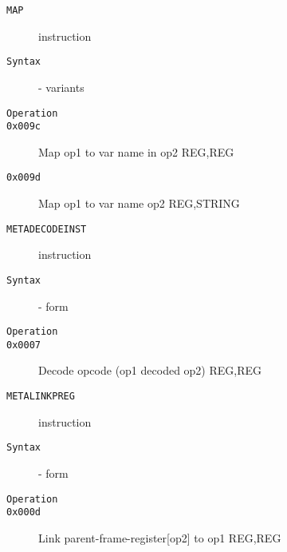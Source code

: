 \begin{description}
\item[\texttt{MAP}] instruction\\
\item[\texttt{Syntax}] - variants\\

\item[\texttt{Operation}]
\item[\texttt{}]
\item[\texttt{0x009c}] Map op1 to var name in op2  {REG,REG}           \\
\item[\texttt{0x009d}] Map op1 to var name op2  {REG,STRING}        \\
\end{description}
\clearpage
\begin{description}
\item[\texttt{METADECODEINST}] instruction\\
\item[\texttt{Syntax}] - form \\

\item[\texttt{Operation}]
\item[\texttt{}]
\item[\texttt{0x0007}]     Decode opcode (op1 decoded op2)  {REG,REG}       \\
\end{description}
\clearpage
\begin{description}
\item[\texttt{METALINKPREG}] instruction\\
\item[\texttt{Syntax}] - form \\

\item[\texttt{Operation}]
\item[\texttt{}]
\item[\texttt{0x000d}]   Link parent-frame-register[op2] to op1  {REG,REG}         \\
\end{description}
